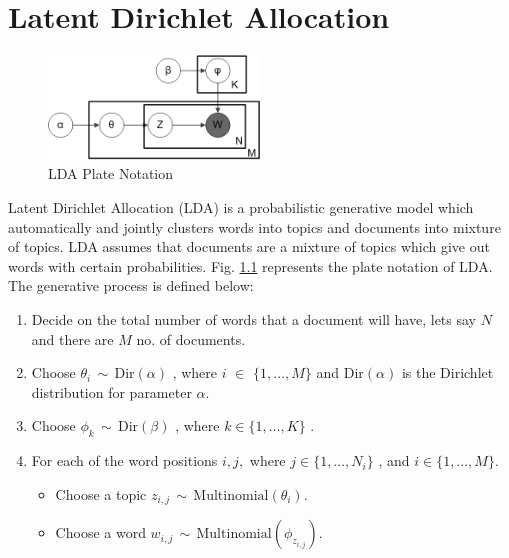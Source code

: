 \chapter{Latent Dirichlet Allocation}

 \begin{figure}
 \centering
 \includegraphics[width=0.5\textwidth]{lda-plate}
 \caption{LDA Plate Notation}
 \label{fig:lda-plate}
\end{figure}

Latent Dirichlet Allocation (LDA) is a probabilistic generative model which automatically and jointly clusters words into topics and documents into mixture of topics. LDA assumes that documents are a mixture of topics which give out words with certain probabilities. Fig. \ref{fig:lda-plate} represents the plate notation of LDA. The generative process is defined below:
\begin{enumerate}
\item Decide on the total number of words that a document will have, lets say $N$ and there are $M$ no. of documents.
\item Choose $\theta_i \, \sim \, \mathrm{Dir}(\alpha)$ , where $i$ $\in$ $\{ 1,\dots,M \}$ and $\mathrm{Dir}(\alpha)$  is the Dirichlet distribution for parameter $\alpha$.
\item Choose $\phi_k \, \sim \, \mathrm{Dir}(\beta)$ , where  $k \in \{ 1,\dots,K \}$ .
\item For each of the word positions $i, j,$ where  $j \in \{ 1,\dots,N_i \}$ , and  $i \in \{ 1,\dots,M \} $.
\begin{itemize}
\item Choose a topic $z_{i,j} \,\sim\, \mathrm{Multinomial}(\theta_i)$. 
\item Choose a word $w_{i,j} \,\sim\, \mathrm{Multinomial}( \phi_{z_{i,j}})$.
\end{itemize}
\end{enumerate}

